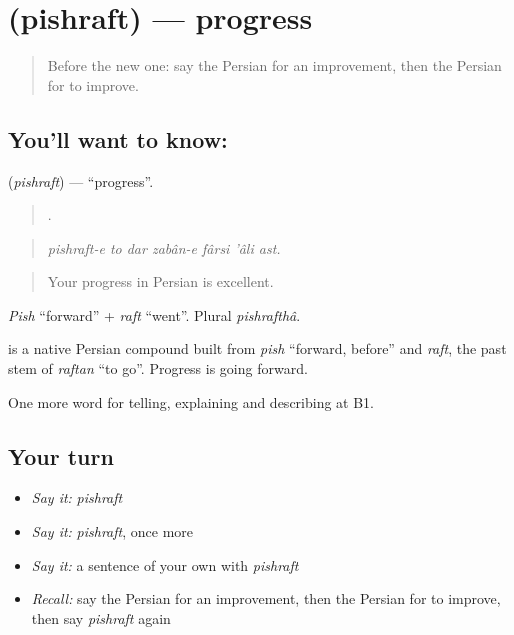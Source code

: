 \section[\texorpdfstring{\fa{پیشرفت} (pishraft)}{پیشرفت (pishraft)}]{ (pishraft) — progress}

\label{lesson:FA-C374-pishraft}



\begin{quote}
Before the new one: say the Persian for an improvement, then the Persian for to improve.
\end{quote}

\subsection*{You'll want to know: }
\textbf{} (\emph{pishraft}) — \textquotedblleft{}progress\textquotedblright{}.

\begin{quote}
      .
\end{quote}

\begin{quote}
\emph{pishraft-e to dar zabân-e fârsi 'âli ast.}
\end{quote}

\begin{quote}
Your progress in Persian is excellent.
\end{quote}

\emph{Pish} \textquotedblleft{}forward\textquotedblright{} + \emph{raft} \textquotedblleft{}went\textquotedblright{}. Plural \emph{pishrafthâ}.

\begin{cousinweb}
\textbf{} is a native Persian compound built from \emph{pish} \textquotedblleft{}forward, before\textquotedblright{} and \emph{raft}, the past stem of \emph{raftan} \textquotedblleft{}to go\textquotedblright{}. Progress is going forward.
\end{cousinweb}

\begin{grammarlens}[title={What you've built}]
One more word for telling, explaining and describing at B1.
\end{grammarlens}

\subsection*{Your turn}
\begin{itemize}
\raggedright
  \item \emph{Say it:} \emph{pishraft}
  \item \emph{Say it:} \emph{pishraft}, once more
  \item \emph{Say it:} a sentence of your own with \emph{pishraft}
  \item \emph{Recall:} say the Persian for an improvement, then the Persian for to improve, then say \emph{pishraft} again
\end{itemize}

